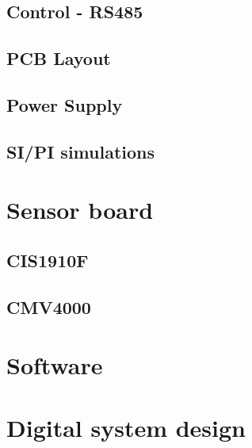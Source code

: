\subsection{Control - RS485}
\subsection{PCB Layout}
\subsection{Power Supply}

\subsection{SI/PI simulations}

\section{Sensor board}
\subsection{CIS1910F}
\subsection{CMV4000}

\section{Software}

\section{Digital system design}


